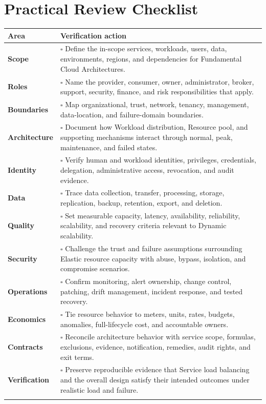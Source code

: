 \documentclass[11pt]{article}
\begin{document}
\section{Practical Review Checklist}
\begin{longtable}{@{}>{\bfseries\color{Teal}}p{}>{\RaggedRight\arraybackslash}p{}@{}}
\toprule\textbf{Area} & \textbf{Verification action}\\\midrule\endhead
Scope & $\square$ Define the in-scope services, workloads, users, data, environments, regions, and dependencies for Fundamental Cloud Architectures. \\\addlinespace[2pt]
Roles & $\square$ Name the provider, consumer, owner, administrator, broker, support, security, finance, and risk responsibilities that apply. \\\addlinespace[2pt]
Boundaries & $\square$ Map organizational, trust, network, tenancy, management, data-location, and failure-domain boundaries. \\\addlinespace[2pt]
Architecture & $\square$ Document how Workload distribution, Resource pool, and supporting mechanisms interact through normal, peak, maintenance, and failed states. \\\addlinespace[2pt]
Identity & $\square$ Verify human and workload identities, privileges, credentials, delegation, administrative access, revocation, and audit evidence. \\\addlinespace[2pt]
Data & $\square$ Trace data collection, transfer, processing, storage, replication, backup, retention, export, and deletion. \\\addlinespace[2pt]
Quality & $\square$ Set measurable capacity, latency, availability, reliability, scalability, and recovery criteria relevant to Dynamic scalability. \\\addlinespace[2pt]
Security & $\square$ Challenge the trust and failure assumptions surrounding Elastic resource capacity with abuse, bypass, isolation, and compromise scenarios. \\\addlinespace[2pt]
Operations & $\square$ Confirm monitoring, alert ownership, change control, patching, drift management, incident response, and tested recovery. \\\addlinespace[2pt]
Economics & $\square$ Tie resource behavior to meters, units, rates, budgets, anomalies, full-lifecycle cost, and accountable owners. \\\addlinespace[2pt]
Contracts & $\square$ Reconcile architecture behavior with service scope, formulas, exclusions, evidence, notification, remedies, audit rights, and exit terms. \\\addlinespace[2pt]
Verification & $\square$ Preserve reproducible evidence that Service load balancing and the overall design satisfy their intended outcomes under realistic load and failure. \\\addlinespace[2pt]
\bottomrule
\end{longtable}
\end{document}
